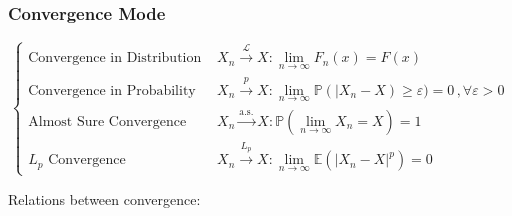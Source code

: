 \subsubsection{Convergence Mode}
    \begin{equation}
        \begin{cases}
            \text{Convergence in Distribution }&{\displaystyle X_n\xrightarrow[]{\mathscr{L}}X:\lim_{n\to\infty}F_n(x)=F(x)}\\
            \text{Convergence in Probability }&{\displaystyle X_n\xrightarrow[]{p}X:\lim_{n\to\infty}\mathbb{P}(|X_n-X)\geq\varepsilon)=0\, ,\forall\varepsilon>0}\\
            \text{Almost Sure Convergence }&{\displaystyle X_n\xrightarrow[]{\text{a.s.}}X:\mathbb{P}(\lim_{n\to\infty}X_n=X)=1}\\
            L_p\text{ Convergence }&{\displaystyle X_n\xrightarrow[]{L_p}X:\lim_{n\to\infty}\mathbb{E}(|X_n-X|^p)=0}
        \end{cases}
    \end{equation}

        Relations between convergence:
        \begin{center}
        \end{center}

